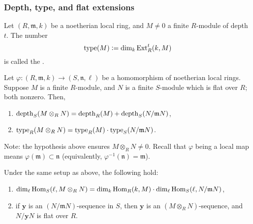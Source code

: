 \documentclass[12pt]{article}
\begin{document}
\subsubsection{Depth, type, and flat extensions}

\begin{defn}
	Let $(R, \mathfrak{m}, k)$ be a noetherian local ring, and $M \neq 0$ a finite $R$-module of depth $t$. The number
	\begin{equation*} 
		\operatorname{type}(M) \vcentcolon= \dim_{k} \operatorname{Ext}_{R}^{t}(k, M)
	\end{equation*}
	is called the .
\end{defn}

\begin{prop} \label{prop:local-algebra-depth-type-tensor}
	Let $\varphi : (R, \mathfrak{m}, k) \to (S, \mathfrak{n}, \ell)$ be a homomorphism of noetherian local rings. Suppose $M$ is a finite $R$-module, and $N$ is a finite $S$-module which is flat over $R$; both nonzero. Then,
	\begin{enumerate}[label=(\alph*)]
		\item $\operatorname{depth}_{S}(M \otimes_{R} N) = \operatorname{depth}_{R}(M) + \operatorname{depth}_{S}(N/\mathfrak{m} N)$,
		\item $\operatorname{type}_{R}(M \otimes_{R} N) = \operatorname{type}_{R}(M) \cdot \operatorname{type}_{S}(N/\mathfrak{m} N)$.
	\end{enumerate}
\end{prop}
Note: the hypothesis above ensures $M \otimes_{R} N \neq 0$. Recall that $\varphi$ being a local map means $\varphi(\mathfrak{m}) \subset \mathfrak{n}$ (equivalently, $\varphi^{-1}(\mathfrak{n}) = \mathfrak{m}$). 
\begin{lem} 
	Under the same setup as above, the following hold:
	\begin{enumerate}[label=(\alph*)]
		\item $\dim_{\ell} \operatorname{Hom}_{S}(\ell, M \otimes_{R} N) = \dim_{k} \operatorname{Hom}_{R}(k, M) \cdot \dim_{\ell} \operatorname{Hom}_{S}(\ell, N/\mathfrak{m} N)$,
		\item if $\mathbf{y}$ is an $(N/\mathfrak{m} N)$-sequence in $S$, then $\mathbf{y}$ is an $(M \otimes_{R} N)$-sequence, and $N/\mathbf{y} N$ is flat over $R$.
	\end{enumerate}
\end{lem}
\end{document}
